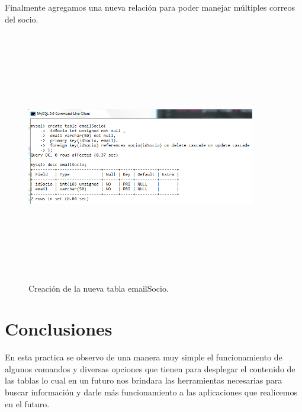 \documentclass[12pt, titlepage]{article}
\begin{document}
Finalmente agregamos una nueva relación para poder manejar múltiples correos del socio.
\begin{figure}[H]
    \begin{center}
        \includegraphics[width=10cm, height=11cm]{img/email-socio.png}
        \caption{Creación de la nueva tabla emailSocio.}
        \label{fig:arlter15}
    \end{center}
\end{figure}
    \section{Conclusiones}
        En esta practica se observo de una manera muy simple el funcionamiento de algunos comandos y diversas opciones que tienen para desplegar el contenido de las tablas lo cual en un futuro nos brindara las herramientas necesarias para buscar información y darle más funcionamiento a las aplicaciones que realicemos en el futuro.
     
    
\end{document}
